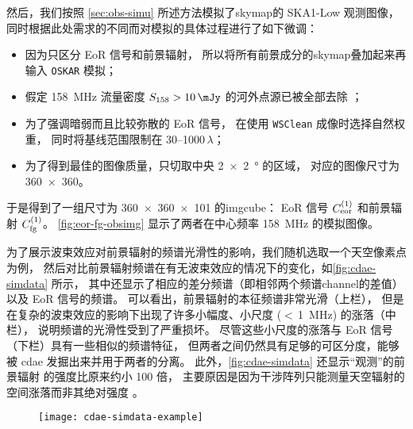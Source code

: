 然后，我们按照 \autoref{sec:obs-simu} 所述方法模拟了\ac{skymap}的
SKA1-Low 观测图像，同时根据此处需求的不同而对模拟的具体过程进行了如下微调：
\begin{itemize}
  \item 因为只区分 EoR 信号和前景辐射，
    所以将所有前景成分的\ac{skymap}叠加起来再输入 \texttt{OSKAR} 模拟；
  \item 假定 \SI{158}{\MHz} 流量密度 $S_{158} > \SI{10}{\mJy}$
    的河外点源已被全部去除 \cite{liu2009ps}；
  \item 为了强调暗弱而且比较弥散的 EoR 信号，
    在使用 \texttt{WSClean} 成像时选择自然权重，
    同时将基线范围限制在 \numrange{30}{1000}$\,\lambda$；
  \item 为了得到最佳的图像质量，只切取中央 \SI{2 x 2}{\degree} 的区域，
    对应的图像尺寸为 \num{360 x 360}。
\end{itemize}
于是得到了一组尺寸为 \num{360 x 360 x 101} 的\ac{imgcube}：
EoR 信号 $C_{\mathrm{eor}}^{(1)}$ 和前景辐射 $C_{\mathrm{fg}}^{(1)}$。
\autoref{fig:eor-fg-obsimg} 显示了两者在中心频率 \SI{158}{\MHz} 的模拟图像。

为了展示波束效应对前景辐射的频谱光滑性的影响，我们随机选取一个天空像素点为例，
然后对比前景辐射频谱在有无波束效应的情况下的变化，如\autoref{fig:cdae-simdata} 所示，
其中还显示了相应的差分频谱（即相邻两个频谱\ac{channel}的差值）以及 EoR 信号的频谱。
可以看出，前景辐射的本征频谱非常光滑（上栏），
但是在复杂的波束效应的影响下出现了许多小幅度、小尺度 ($<$\,\SI{1}{\MHz}) 的涨落（中栏），
说明频谱的光滑性受到了严重损坏。
尽管这些小尺度的涨落与 EoR 信号（下栏）具有一些相似的频谱特征，
但两者之间仍然具有足够的可区分度，能够被 \ac{cdae} 发掘出来并用于两者的分离。
此外，\autoref{fig:cdae-simdata} 还显示\enquote{观测}的前景辐射
的强度比原来约小 100 倍，
主要原因是因为干涉阵列只能测量天空辐射的空间涨落而非其绝对强度 \cite{braun1985}。

\begin{figure}[htp]
  \centering
  \texttt{[image: cdae-simdata-example]}
  \label{fig:cdae-simdata}
\end{figure}

